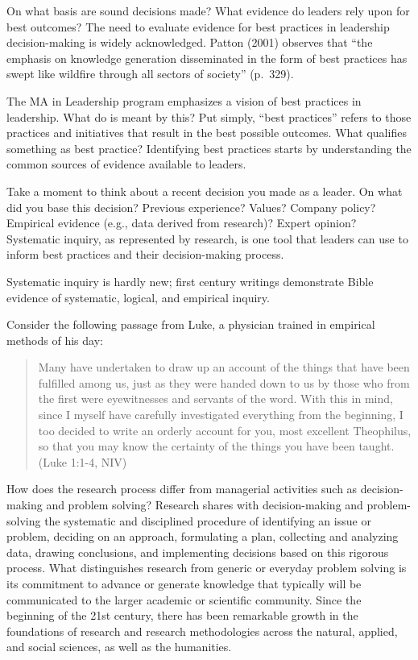 \documentclass[
  letterpaper,
  DIV=11,
  numbers=noendperiod]{scrreprt}
\begin{document}
On what basis are sound decisions made? What evidence do leaders rely
upon for best outcomes? The need to evaluate evidence for best practices
in leadership decision-making is widely acknowledged. Patton (2001)
observes that ``the emphasis on knowledge generation disseminated in the
form of best practices has swept like wildfire through all sectors of
society'' (p.~329).

The MA in Leadership program emphasizes a vision of best practices in
leadership. What do is meant by this? Put simply, ``best practices''
refers to those practices and initiatives that result in the best
possible outcomes. What qualifies something as best practice?
Identifying best practices starts by understanding the common sources of
evidence available to leaders.

Take a moment to think about a recent decision you made as a leader. On
what did you base this decision? Previous experience? Values? Company
policy? Empirical evidence (e.g., data derived from research)? Expert
opinion? Systematic inquiry, as represented by research, is one tool
that leaders can use to inform best practices and their decision-making
process.

Systematic inquiry is hardly new; first century writings demonstrate
Bible evidence of systematic, logical, and empirical inquiry.

Consider the following passage from Luke, a physician trained in
empirical methods of his day:

\begin{quote}
Many have undertaken to draw up an account of the things that have been
fulfilled among us, just as they were handed down to us by those who
from the first were eyewitnesses and servants of the word. With this in
mind, since I myself have carefully investigated everything from the
beginning, I too decided to write an orderly account for you, most
excellent Theophilus, so that you may know the certainty of the things
you have been taught. (Luke 1:1-4, NIV)
\end{quote}

How does the research process differ from managerial activities such as
decision-making and problem solving? Research shares with
decision-making and problem-solving the systematic and disciplined
procedure of identifying an issue or problem, deciding on an approach,
formulating a plan, collecting and analyzing data, drawing conclusions,
and implementing decisions based on this rigorous process. What
distinguishes research from generic or everyday problem solving is its
commitment to advance or generate knowledge that typically will be
communicated to the larger academic or scientific community. Since the
beginning of the 21st century, there has been remarkable growth in the
foundations of research and research methodologies across the natural,
applied, and social sciences, as well as the humanities.
\end{document}
